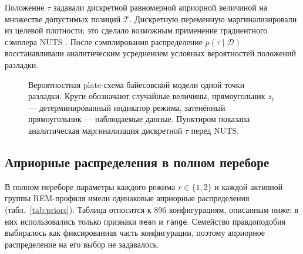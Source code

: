 \documentclass[14pt]{mmcs_article}
\begin{document}
Положение $\tau$ задавали дискретной равномерной априорной величиной
на множестве допустимых позиций $\mathcal T$. Дискретную переменную
маргинализировали из целевой плотности; это сделало возможным применение
градиентного сэмплера NUTS \cite{HoffmanGelman2014,
lai2023automaticallymarginalizedmcmcprobabilistic}. После
сэмплирования распределение $p(\tau\mid\mathcal D)$ восстанавливали
аналитическим усреднением условных вероятностей положений разладки.

\begin{figure}[H]
  \centering
  \resizebox{\textwidth}{!}{}
  \caption{Вероятностная plate-схема байесовской модели одной точки
  разладки. Круги обозначают случайные величины, прямоугольник $z_t$ ---
  детерминированный индикатор режима, затенённый прямоугольник ---
  наблюдаемые данные. Пунктиром показана аналитическая маргинализация
  дискретной $\tau$ перед NUTS.}
  \label{fig:tau-model}
\end{figure}

\subsection{Априорные распределения в полном переборе}

В полном переборе параметры каждого режима $r\in\{1,2\}$ и каждой
активной группы REM-профиля имели одинаковые априорные распределения
(табл.~\ref{tab:priors}). Таблица относится к 896 конфигурациям,
описанным ниже: в них использовались только признаки \texttt{mean} и
\texttt{range}. Семейство правдоподобия выбиралось как фиксированная
часть конфигурации, поэтому априорное распределение на его выбор не
задавалось.
\end{document}
